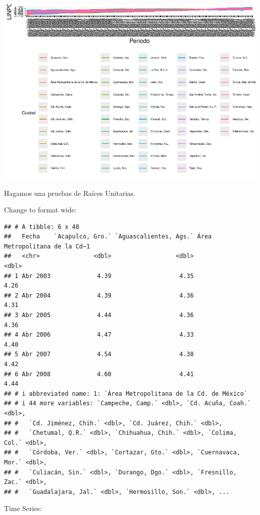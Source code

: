 \documentclass[
]{book}
\begin{document}
\includegraphics{Notas-Series-Tiempo_files/figure-latex/unnamed-chunk-39-1.pdf}

Hagamos una pruebas de Raíces Unitarias.

Change to format wide:

\begin{verbatim}
## # A tibble: 6 x 48
##   Fecha    `Acapulco, Gro.` `Aguascalientes, Ags.` Área Metropolitana de la Cd~1
##   <chr>               <dbl>                  <dbl>                         <dbl>
## 1 Abr 2003             4.39                   4.35                          4.26
## 2 Abr 2004             4.39                   4.36                          4.31
## 3 Abr 2005             4.44                   4.36                          4.36
## 4 Abr 2006             4.47                   4.33                          4.40
## 5 Abr 2007             4.54                   4.38                          4.42
## 6 Abr 2008             4.60                   4.41                          4.44
## # i abbreviated name: 1: `Área Metropolitana de la Cd. de México`
## # i 44 more variables: `Campeche, Camp.` <dbl>, `Cd. Acuña, Coah.` <dbl>,
## #   `Cd. Jiménez, Chih.` <dbl>, `Cd. Juárez, Chih.` <dbl>,
## #   `Chetumal, Q.R.` <dbl>, `Chihuahua, Chih.` <dbl>, `Colima, Col.` <dbl>,
## #   `Córdoba, Ver.` <dbl>, `Cortazar, Gto.` <dbl>, `Cuernavaca, Mor.` <dbl>,
## #   `Culiacán, Sin.` <dbl>, `Durango, Dgo.` <dbl>, `Fresnillo, Zac.` <dbl>,
## #   `Guadalajara, Jal.` <dbl>, `Hermosillo, Son.` <dbl>, ...
\end{verbatim}

Time Series:
\end{document}

